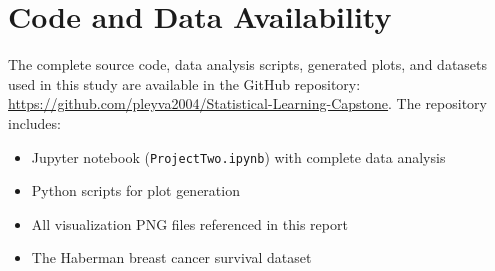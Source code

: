 \documentclass[12pt,a4paper]{article}
\begin{document}
\section{Code and Data Availability}

The complete source code, data analysis scripts, generated plots, and datasets used in this study are available in the GitHub repository: \url{https://github.com/pleyva2004/Statistical-Learning-Capstone}. The repository includes:
\begin{itemize}
    \item Jupyter notebook (\texttt{ProjectTwo.ipynb}) with complete data analysis
    \item Python scripts for plot generation
    \item All visualization PNG files referenced in this report
    \item The Haberman breast cancer survival dataset
\end{itemize}
\end{document}
